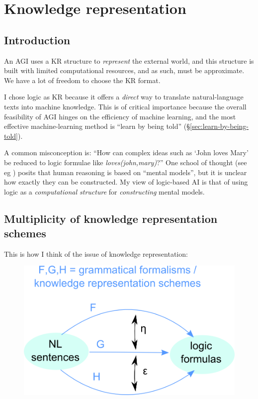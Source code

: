 \chapter{Knowledge representation}
\minitoc

\section{Introduction}

An AGI uses a KR structure to \textit{represent} the external world, and this structure is built with limited computational resources, and as such, must be approximate.  We have a lot of freedom to choose the KR format.

I chose logic as KR because it offers a \textit{direct} way to translate natural-language texts into machine knowledge.  This is of critical importance because the overall feasibility of AGI hinges on the efficiency of machine learning, and the most effective machine-learning method is ``learn by being told'' (\S\ref{sec:learn-by-being-told}).

A common misconception is:  ``How can complex ideas such as `John loves Mary' be reduced to logic formulae like \textit{loves(john,mary)}?''  One school of thought (see eg \citep*{Johnson-Laird1983}) posits that human reasoning is based on ``mental models'', but it is unclear how exactly they can be constructed.  My view of logic-based AI is that of using logic as a \textit{computational structure} for \textit{constructing} mental models.


\section{Multiplicity of knowledge representation schemes}

This is how I think of the issue of knowledge representation:\\
\begin{figure}[H]
\centering
\includegraphics[scale=0.75]{KR-functors.png}
\end{figure}

